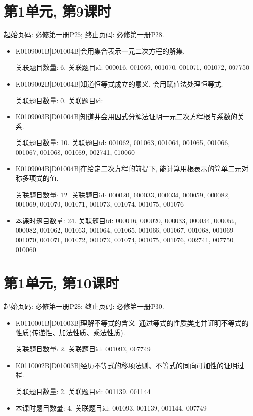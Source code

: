 \section*{第1单元, 第9课时}
起始页码: 必修第一册P26; 终止页码: 必修第一册P28.
\begin{itemize}
\item K0109001B|D01004B|会用集合表示一元二次方程的解集.

关联题目数量: 6. 关联题目id: 000016, 001069, 001070, 001071, 001072, 007750

\item K0109002B|D01004B|知道恒等式成立的意义, 会用赋值法处理恒等式.

关联题目数量: 0. 关联题目id: 

\item K0109003B|D01004B|知道并会用因式分解法证明一元二次方程根与系数的关系.

关联题目数量: 10. 关联题目id: 001062, 001063, 001064, 001065, 001066, 001067, 001068, 001069, 002741, 010060

\item K0109004B|D01004B|在给定二次方程的前提下, 能计算用根表示的简单二元对称多项式的值.

关联题目数量: 12. 关联题目id: 000020, 000033, 000034, 000059, 000082, 001069, 001070, 001071, 001073, 001074, 001075, 001076

\item 本课时题目数量: 24. 关联题目id: 000016, 000020, 000033, 000034, 000059, 000082, 001062, 001063, 001064, 001065, 001066, 001067, 001068, 001069, 001070, 001071, 001072, 001073, 001074, 001075, 001076, 002741, 007750, 010060

\end{itemize}

\section*{第1单元, 第10课时}
起始页码: 必修第一册P28; 终止页码: 必修第一册P30.
\begin{itemize}
\item K0110001B|D01003B|理解不等式的含义, 通过等式的性质类比并证明不等式的性质(传递性、加法性质、乘法性质).

关联题目数量: 2. 关联题目id: 001093, 007749

\item K0110002B|D01003B|经历不等式的移项法则、不等式的同向可加性的证明过程.

关联题目数量: 2. 关联题目id: 001139, 001144

\item 本课时题目数量: 4. 关联题目id: 001093, 001139, 001144, 007749

\end{itemize}


